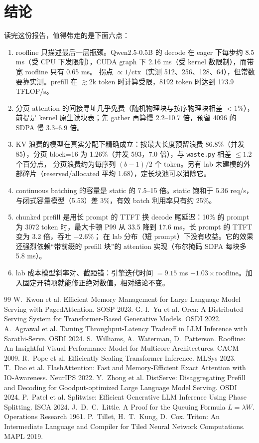 \documentclass[11pt,a4paper]{ctexart}
\begin{document}
\section{结论}
读完这份报告，值得带走的是下面六点：
\begin{enumerate}
\item roofline 只描述最后一层瓶颈。Qwen2.5-0.5B 的 decode 在 eager 下每步约 8.5 ms（受 CPU 下发限制），CUDA graph 下 2.16 ms（受 kernel 数限制），而带宽 roofline 只有 0.65 ms。
拐点 $\propto1/\text{ctx}$（实测 512、256、128、64），但常数要靠实测。prefill 在 $\gtrsim$2k token 时计算受限，8192 token 时达到 173.9 TFLOP/s。
\item 分页 attention 的间接寻址几乎免费（随机物理块与按序物理块相差 $<1\%$），前提是 kernel 原生读块表；先 gather 再算慢 2.2--10.7 倍，预留 4096 的 SDPA 慢 3.3--6.9 倍。
\item KV 浪费的模型在真实分配下精确成立：按最大长度预留浪费 86.8\%（并发 85），分页 block=16 为 1.26\%（并发 593，7.0 倍），与 \texttt{waste.py} 相差 $\le1.2$ 个百分点，
分页浪费约为每序列 $(b-1)/2$ 个 token。另有 lab 未建模的外部碎片（reserved/allocated 平均 1.68），定长块池可以消除它。
\item continuous batching 的容量是 static 的 7.5--15 倍。static 饱和于 5.36 req/s，与闭式容量模型（5.53）差 3\%，有效 batch 利用率只有约 25\%。
\item chunked prefill 是用长 prompt 的 TTFT 换 decode 尾延迟：10\% 的 prompt 为 3072 token 时，最大卡顿 P99 从 33.5 降到 17.6 ms，长 prompt 的 TTFT 变为 3.2 倍，吞吐 $-2.6\%$；
在 lab 分布（短 prompt）下没有收益。它的效果还强烈依赖“带前缀的 prefill 块”的 attention 实现（布尔掩码 SDPA 每块多 5.8 ms）。
\item lab 成本模型斜率对、截距错：引擎迭代时间 $=9.15$ ms $+1.03\times$roofline。加入固定开销项就能修正绝对数值，相对结论不变。
\end{enumerate}

\begin{thebibliography}{99}
 W.~Kwon et al. Efficient Memory Management for Large Language Model Serving with PagedAttention. SOSP 2023.
 G.-I.~Yu et al. Orca: A Distributed Serving System for Transformer-Based Generative Models. OSDI 2022.
 A.~Agrawal et al. Taming Throughput-Latency Tradeoff in LLM Inference with Sarathi-Serve. OSDI 2024.
 S.~Williams, A.~Waterman, D.~Patterson. Roofline: An Insightful Visual Performance Model for Multicore Architectures. CACM 2009.
 R.~Pope et al. Efficiently Scaling Transformer Inference. MLSys 2023.
 T.~Dao et al. FlashAttention: Fast and Memory-Efficient Exact Attention with IO-Awareness. NeurIPS 2022.
 Y.~Zhong et al. DistServe: Disaggregating Prefill and Decoding for Goodput-optimized Large Language Model Serving. OSDI 2024.
 P.~Patel et al. Splitwise: Efficient Generative LLM Inference Using Phase Splitting. ISCA 2024.
 J.~D.~C.~Little. A Proof for the Queuing Formula $L=\lambda W$. Operations Research 1961.
 P.~Tillet, H.~T.~Kung, D.~Cox. Triton: An Intermediate Language and Compiler for Tiled Neural Network Computations. MAPL 2019.
\end{thebibliography}
\end{document}
